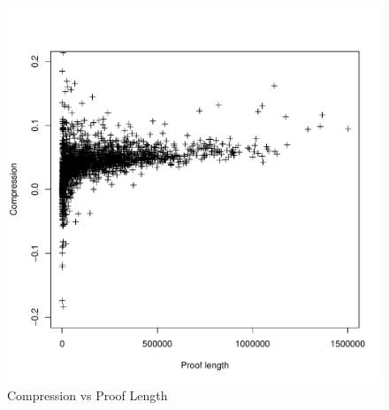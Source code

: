 \documentclass{beamer}
\begin{document}
\begin{frame}
\begin{figure}[h]
	\centering
	\includegraphics[scale=0.8]{../latex/chapters/congruence/figures/compression_vs_length.pdf}
	\caption{Compression vs Proof Length}
	\label{fig:congruence_compression}
\end{figure}

\end{frame}
\end{document}
